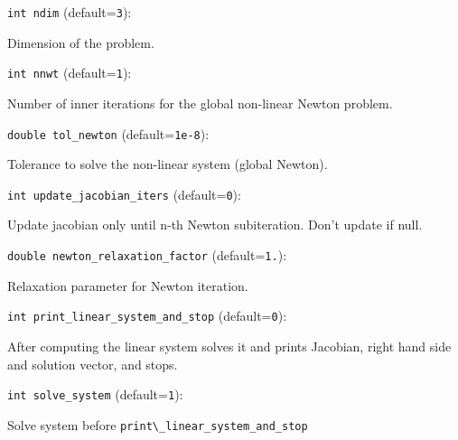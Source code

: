 \item\verb+int ndim+ {\rm(default=\verb|3|)}:

Dimension of the problem.

\item\verb+int nnwt+ {\rm(default=\verb|1|)}:

Number of inner iterations for the global non-linear
Newton  problem. 

\item\verb+double tol_newton+ {\rm(default=\verb|1e-8|)}:

Tolerance to solve the non-linear system (global Newton).

\item\verb+int update_jacobian_iters+ {\rm(default=\verb|0|)}:

Update jacobian only until n-th Newton subiteration. 
Don't update if null. 

\item\verb+double newton_relaxation_factor+ {\rm(default=\verb|1.|)}:

Relaxation parameter for Newton iteration. 

\item\verb+int print_linear_system_and_stop+ {\rm(default=\verb|0|)}:

After computing the linear system solves it and prints Jacobian,
right hand side and solution vector, and stops. 

\item\verb+int solve_system+ {\rm(default=\verb|1|)}:

Solve system before \verb+print\_linear_system_and_stop+

